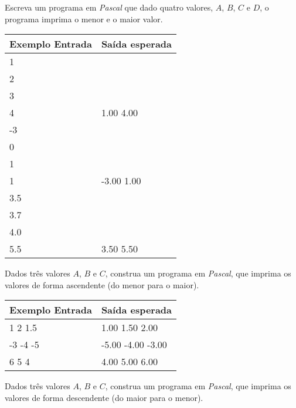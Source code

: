 \item Escreva um programa em \emph{Pascal} que dado quatro valores, 
$A$, $B$, $C$ e $D$, o programa imprima o menor e o maior valor.

\begin{center}
\begin{tabular}{|l|l|} \hline
Exemplo Entrada & Saída esperada \\ \hline
1                &                \\ 
2                &                \\ 
3                &                \\ 
4                & 1.00 4.00               \\ \hline
-3                &                \\ 
0               &                \\ 
1               &                \\ 
1               &  -3.00 1.00              \\ \hline
3.5                &                \\
3.7                &                \\
4.0                &                \\
5.5                & 3.50 5.50               \\ \hline
\end{tabular}
\end{center}

\item Dados três valores $A$, $B$ e $C$, construa um programa em \emph{Pascal},
 que imprima os valores de forma ascendente (do menor para o maior).

\begin{center}
\begin{tabular}{|l|l|} \hline
Exemplo Entrada & Saída esperada \\ \hline
1 2 1.5                & 1.00 1.50 2.00               \\ \hline
-3 -4 -5              & -5.00 -4.00 -3.00               \\ \hline
6 5 4                & 4.00 5.00 6.00               \\ \hline
\end{tabular}
\end{center}

\item Dados três valores $A$, $B$ e $C$, construa um programa em \emph{Pascal},
 que imprima os valores de forma descendente (do maior para o menor).

